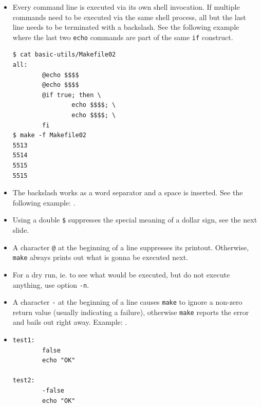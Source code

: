 \begin{itemize}
\item {}  Every command line is executed via its own shell invocation.  If
multiple commands need to be executed via the same shell process, all but the
last line needs to be terminated with a backslash.  See the following example
where the last two \texttt{echo} commands are part of the same \texttt{if}
construct.

\begin{verbatim}
$ cat basic-utils/Makefile02
all:
        @echo $$$$
        @echo $$$$
        @if true; then \
                echo $$$$; \
                echo $$$$; \
        fi
$ make -f Makefile02
5513
5514
5515
5515
\end{verbatim}

\item The backslash works as a word separator and a space is inserted.  See
the following example: .
\item Using a double \texttt{\$} suppresses the special meaning of a dollar
sign, see the next slide.
\item A character \texttt{@} at the beginning of a line suppresses its printout.
Otherwise, \texttt{make} always prints out what is gonna be executed next.
\item For a dry run, ie. to see what would be executed, but do not execute
anything, use option \texttt{-n}.
\item A character \texttt{-} at the beginning of a line causes \texttt{make} to
ignore a non-zero return value (usually indicating a failure), otherwise
\texttt{make} reports the error and bails out right away.  Example:
\example{basic-utils/Makefile04}.
\item 
\begin{verbatim}
test1:
        false
        echo "OK"

test2:
        -false
        echo "OK"
\end{verbatim}
\end{itemize}


